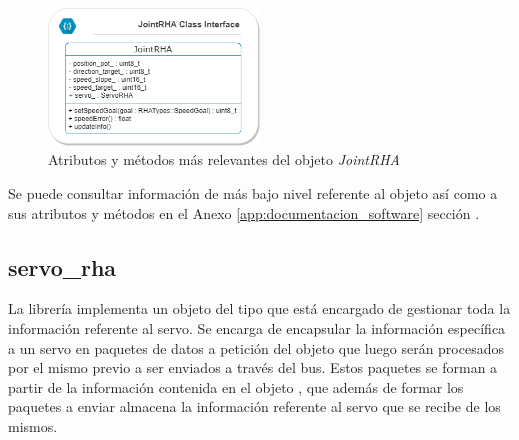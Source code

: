         \begin{figure}[H]
            \centering
            \includegraphics[width=0.5\textwidth]{figuras/SW/class_diagram_JRHA.png}   
            \caption{Atributos y métodos más relevantes del objeto \textit{JointRHA}}
            \label{fig:SW:class_diagram_JRHA}
        \end{figure}
        
        Se puede consultar información de más bajo nivel referente al objeto  así como a sus atributos y métodos en el Anexo \ref{app:documentacion_software} sección \completar.
        
    \subsection{servo\_rha} \label{subsec:SW:lib:servo_rha}
        La librería  implementa un objeto del tipo  que está encargado de gestionar toda la información referente al servo. Se encarga de encapsular la información específica a un servo en paquetes de datos a petición del objeto  que luego serán procesados por el mismo previo a ser enviados a través del bus. Estos paquetes se forman a partir de la información contenida en el objeto , que además de formar los paquetes a enviar almacena la información referente al servo que se recibe de los mismos. 
        \\
        
